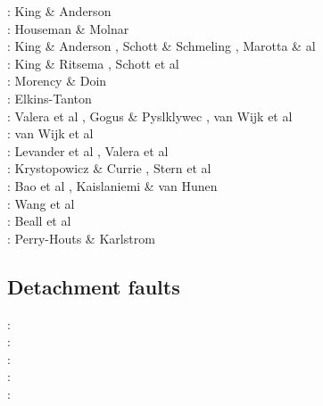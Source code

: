 \begin{scriptsize}
\nineteenninetyfive: King \& Anderson \cite{kian95}\\
\nineteenninetyseven: Houseman \& Molnar \cite{homo97}\\
\nineteenninetyeight: King \& Anderson \cite{kian98}, Schott \& Schmeling \cite{scsc98}, 
Marotta \& al \cite{mafs98}\\
\twothousand: King \& Ritsema \cite{kiri00}, Schott et al \cite{scys00}\\
\twothousandfour: Morency \& Doin \cite{modo04}\\
\twothousandseven: Elkins-Tanton \cite{elki07}\\
\twothousandeight: Valera et al \cite{vanv08}, Gogus \& Pyslklywec \cite{gopy08}, 
van Wijk et al \cite{vavg08}\\
\twothousandten: van Wijk et al \cite{vabv10}\\
\twothousandeleven: Levander et al \cite{lesm11}, Valera et al \cite{vanj11}\\
\twothousandthirteen: Krystopowicz \& Currie \cite{krcu13}, Stern et al \cite{sths13}\\
\twothousandfourteen: Bao et al \cite{baeg14}, Kaislaniemi \& van Hunen \cite{kava14}\\
\twothousandfifteen: Wang et al \cite{wahz15}\\
\twothousandseventeen: Beall et al \cite{bems17}\\
\twothousandeighteen: Perry-Houts \& Karlstrom \cite{peka18}
\end{scriptsize}


\subsection{Detachment faults} 

\begin{scriptsize}
\twothousandseven: \cite{werr07}\\
\twothousandten: \cite{jaml10}\\
\twothousandeleven: \cite{rera11}\\
\twothousandfifteen: \cite{matv15}\\
\twothousandnineteen: \cite{gubg19}
\end{scriptsize}


